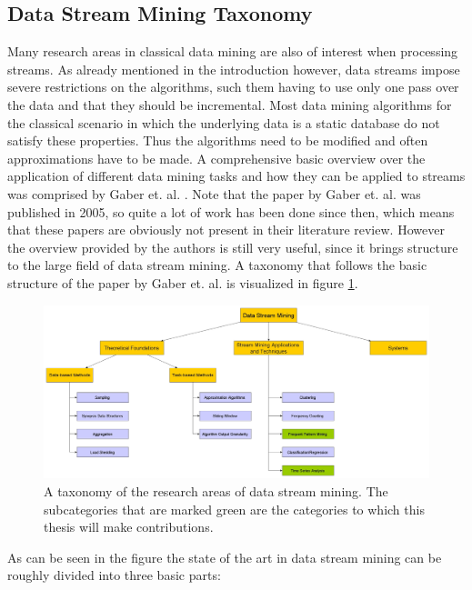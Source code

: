 \subsection{Data Stream Mining Taxonomy}
\label{subsec_dataStreamMiningTaxonomy}
Many research areas in classical data mining are also of interest when processing streams. As already mentioned in the introduction however, data streams impose severe restrictions on the algorithms, such them having to use only one pass over the data and that they should be incremental. Most data mining algorithms for the classical scenario in which the underlying data is a static database do not satisfy these properties. Thus the algorithms need to be modified and often approximations have to be made. A comprehensive basic overview over the application of different data mining tasks and how they can be applied to streams was comprised by Gaber et. al. \cite{gaber2005mining}. Note that the paper by Gaber et. al. was published in 2005, so quite a lot of work has been done since then, which means that these papers are obviously not present in their literature review. However the overview provided by the authors is still very useful, since it brings structure to the large field of data stream mining. A taxonomy that follows the basic structure of the paper by Gaber et. al. is visualized in figure \ref{fig_streamMiningTaxonomy}.

\begin{figure}[h]
	\centering
  	\includegraphics[width=\textwidth]{streamMiningTaxonomy}
	\caption{A taxonomy of the research areas of data stream mining. The subcategories that are marked green are the categories to which this thesis will make contributions.}
	\label{fig_streamMiningTaxonomy}
\end{figure}

As can be seen in the figure the state of the art in data stream mining can be roughly divided into three basic parts:

